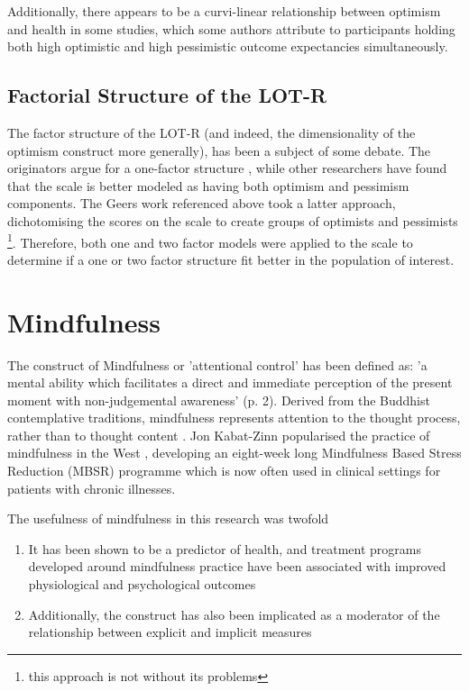 \documentclass{article}
\begin{document}
Additionally, there appears to be a curvi-linear relationship between optimism and health in some studies, which some authors attribute to participants holding both high optimistic and high pessimistic outcome expectancies simultaneously. 

\subsection{Factorial Structure of the LOT-R}
\label{sec:fact-struct-lot}

The factor structure of the LOT-R (and indeed, the dimensionality of the optimism construct more generally), has been a subject of some debate. The originators argue for a one-factor structure \cite{Carver2010}\cite{Scheier1994}, while other researchers have found that the scale is better modeled as having both optimism and pessimism components. The Geers work referenced above took a latter approach, dichotomising the scores on the scale to create groups of optimists and pessimists \footnote{this approach is not without its problems}. Therefore, both one and two factor models were applied to the scale to determine if a one or two factor structure fit better in the population of interest. 


\section{Mindfulness}

The construct of Mindfulness or 'attentional control' has been defined as: 'a mental ability which facilitates a direct and 
immediate perception of the present moment with non-judgemental awareness' \cite{kohls2009facets} (p. 2). Derived from the Buddhist 
contemplative traditions, mindfulness represents attention to the thought process, rather than to thought content \cite{brown2007addressing}. 
Jon Kabat-Zinn popularised the practice of mindfulness in the West \cite{Kabat-Zinn2003}, developing an eight-week 
long Mindfulness Based Stress Reduction (MBSR) programme which is now often used in clinical settings for patients with chronic illnesses. 

The usefulness of mindfulness in this research was twofold
\begin{enumerate}
\item It has been shown to be a predictor of health, and treatment programs developed around mindfulness practice have been associated with improved physiological and psychological outcomes

\item Additionally, the construct has also been implicated as a moderator of the relationship between explicit and implicit measures \cite{Levesque2007}
\end{enumerate}
\end{document}
